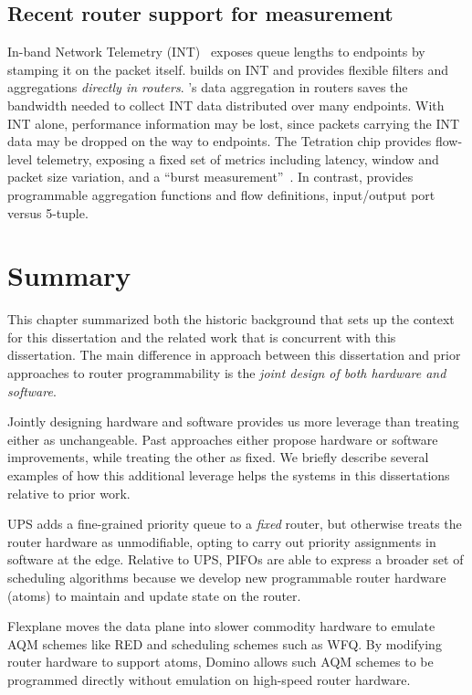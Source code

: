 \subsection{Recent router support for measurement} In-band Network Telemetry
(INT)~\cite{int, tpp} exposes queue lengths to endpoints by stamping it on the
packet itself. \TheSystem builds on INT and provides flexible filters and
aggregations {\em directly in routers}.  \TheSystem's data aggregation in
routers saves the bandwidth needed to collect INT data distributed over many
endpoints. With INT alone, performance information may be lost, since packets
carrying the INT data may be dropped on the way to endpoints. The Tetration
chip provides flow-level telemetry, exposing a fixed set of metrics including
latency, window and packet size variation, and a ``burst
measurement''~\cite{tetration-telemetry}. In contrast, \TheSystem provides
programmable aggregation functions and flow definitions, \eg input/output port
versus 5-tuple.

\section{Summary}
This chapter summarized both the historic background that sets up the context
for this dissertation and the related work that is concurrent with this
dissertation. The main difference in approach between this dissertation and
prior approaches to router programmability is the {\em joint design of both
hardware and software}.

Jointly designing hardware and software provides us more leverage than treating
either as unchangeable. Past approaches either propose hardware or software
improvements, while treating the other as fixed. We briefly describe several
examples of how this additional leverage helps the systems in this
dissertations relative to prior work.

 UPS adds a fine-grained priority queue to a
{\em fixed} router, but otherwise treats the router hardware as unmodifiable,
opting to carry out priority assignments in software at the edge. Relative to
UPS, PIFOs are able to express a broader set of scheduling algorithms because
we develop new programmable router hardware (atoms) to maintain and update
state on the router.

 Flexplane moves the data plane into slower commodity hardware
to emulate AQM schemes like RED and scheduling schemes such as WFQ. By
modifying router hardware to support atoms,  Domino allows such AQM schemes to
be programmed directly without emulation on high-speed router hardware.

